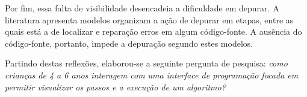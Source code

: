 Por fim, essa falta de visibilidade desencadeia a dificuldade em depurar. A literatura \cite{carver_assessing_1986, mccauley_debugging_2008} apresenta modelos organizam a ação de depurar em etapas, entre as quais está a de localizar e reparação erros em algum código-fonte. A ausência do código-fonte, portanto, impede a depuração segundo estes modelos.

Partindo destas reflexões, elaborou-se a seguinte pergunta de pesquisa: 
\textit{como crianças de 4 a 6 anos interagem com uma interface de programação focada em permitir visualizar os passos e a execução de um algoritmo?}

